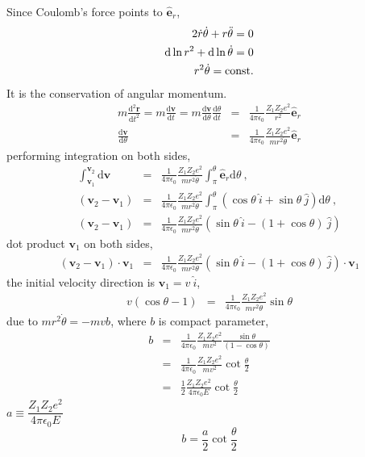 \documentclass[12pt,a4paper]{article}
\renewcommand{\vec}[1]{\boldsymbol{#1}}
\newcommand{\dif}{\mathrm{d}}
\begin{document}
Since Coulomb's force points to $\vec{\hat{e}}_r$, 
\begin{eqnarray}
2\dot{r} \dot{\theta} +r\ddot{\theta} = 0 \\
\nonumber \dif \ln r^2 +\dif \ln \dot{\theta} = 0 \\
r^2 \dot{\theta} = {\rm const.}
\end{eqnarray}
It is the conservation of angular momentum.
\begin{eqnarray}
m\frac{\dif^2 \vec{r}}{\dif t^2} = m \frac{\dif \vec{v}}{\dif t} = m \frac{\dif \vec{v}}{\dif \theta} \frac{\dif \theta}{\dif t} &=& \frac{1}{4\pi \epsilon_0} \frac{Z_1 Z_2e^2}{r^2} \vec{\hat{e}}_r \\
\frac{\dif \vec{v}}{\dif \theta} &=& \frac{1}{4\pi \epsilon_0} \frac{Z_1 Z_2e^2}{m r^2 \dot{\theta}} \vec{\hat{e}}_r
\end{eqnarray}
performing integration on both sides,
\begin{eqnarray}
\int_{\vec{v}_1}^{\vec{v}_2} \dif \vec{v} &=& \frac{1}{4\pi \epsilon_0} \frac{Z_1 Z_2e^2}{m r^2 \dot{\theta}} \int_\pi^\theta \vec{\hat{e}}_r \dif \theta ~, \\
\nonumber (\vec{v}_2 -\vec{v}_1) &=& \frac{1}{4\pi \epsilon_0} \frac{Z_1 Z_2e^2}{m r^2 \dot{\theta}} \int_\pi^\theta (\cos \theta ~\hat{i} + \sin \theta ~\hat{j}) \dif \theta ~, \\
(\vec{v}_2 -\vec{v}_1) &=& \frac{1}{4\pi \epsilon_0} \frac{Z_1 Z_2e^2}{m r^2 \dot{\theta}} (\sin \theta ~\hat{i} -(1+\cos \theta) ~\hat{j})
\end{eqnarray}
dot product $\vec{v}_1$ on both sides, 
\begin{eqnarray}
(\vec{v}_2 -\vec{v}_1) \cdot \vec{v}_1 &=& \frac{1}{4\pi \epsilon_0} \frac{Z_1 Z_2e^2}{m r^2 \dot{\theta}} (\sin \theta ~\hat{i} -(1+\cos \theta) ~\hat{j}) \cdot \vec{v}_1
\end{eqnarray}
the initial velocity direction is $\vec{v}_1 = v ~\hat{i}$, 
\begin{eqnarray}
v (\cos \theta -1) &=& \frac{1}{4\pi \epsilon_0} \frac{Z_1 Z_2e^2}{m r^2 \dot{\theta}} \sin \theta
\end{eqnarray}
due to $m r^2 \dot{\theta} = -m vb$, where $b$ is compact parameter,
\begin{eqnarray}
\nonumber b &=& \frac{1}{4\pi \epsilon_0} \frac{Z_1 Z_2e^2}{m v^2} \frac{\sin \theta }{(1-\cos \theta)} \\
\nonumber &=& \frac{1}{4\pi \epsilon_0} \frac{Z_1 Z_2e^2}{m v^2} \cot \frac{\theta}{2} \\
&=& \frac{1}{2} \frac{Z_1 Z_2e^2}{4\pi \epsilon_0 E} \cot \frac{\theta}{2} 
\end{eqnarray}
$a \equiv \dfrac{Z_1 Z_2e^2}{4\pi \epsilon_0 E}$
\begin{equation}
b = \frac{a}{2} \cot \frac{\theta}{2}
\end{equation}
\end{document}
